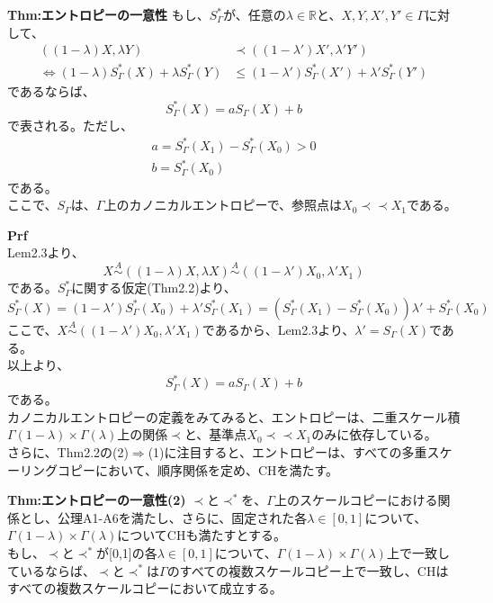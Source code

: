 \documentclass[a4paper,11pt]{jsarticle}
\numberwithin{equation}{section}
\begin{document}
\begin{itembox}[l]{\textbf{Thm:エントロピーの一意性}}
もし、$S_{\Gamma}^*$が、任意の$\lambda \in \mathbb{R}$と、$X,Y,X',Y' \in \Gamma $に対して、
\begin{align}
    ((1-\lambda)X,\lambda Y) &\prec ((1-\lambda')X',\lambda' Y') \\
    \Leftrightarrow (1-\lambda)S_{\Gamma}^*(X)+\lambda S_{\Gamma}^*(Y) &\leq (1-\lambda')S_{\Gamma}^*(X')+\lambda' S_{\Gamma}^*(Y')
\end{align}
であるならば、
\begin{equation}
    S_{\Gamma}^*(X)=aS_{\Gamma} (X)+b
\end{equation}
で表される。ただし、
\begin{align}
    a = S_{\Gamma}^*(X_1)-S_{\Gamma}^*(X_0)>0\\
    b = S_{\Gamma}^*(X_0)
\end{align}
である。\\
ここで、$S_{\Gamma}$は、$\Gamma$上のカノニカルエントロピーで、参照点は$X_0 \prec \prec X_1$である。
\end{itembox}
\textbf{Prf}\\
Lem2.3より、
\begin{equation}
    X \overset{A}{\sim} ((1-\lambda)X,\lambda X) \overset{A}{\sim} ((1-\lambda')X_0,\lambda' X_1)
\end{equation}
である。$S_{\Gamma}^*$に関する仮定(Thm2.2)より、
\begin{equation}
    S_{\Gamma}^*(X) = (1-\lambda')S_{\Gamma}^*(X_0)+\lambda' S_{\Gamma}^*(X_1)=(S_{\Gamma}^*(X_1)-S_{\Gamma}^*(X_0))\lambda'+S_{\Gamma}^*(X_0)
\end{equation}
ここで、$X \overset{A}{\sim} ((1-\lambda')X_0,\lambda' X_1)$であるから、Lem2.3より、$\lambda ' = S_{\Gamma}(X)$である。\\
以上より、
\begin{equation}
    S_{\Gamma}^*(X) = aS_{\Gamma}(X)+b
\end{equation}
である。\hfill\qedsymbol\\

カノニカルエントロピーの定義をみてみると、エントロピーは、二重スケール積$\Gamma(1-\lambda)\times \Gamma(\lambda)$上の関係$\prec$と、基準点$X_0 \prec \prec X_1$のみに依存している。\\
さらに、Thm2.2の(2)$ \Rightarrow $(1)に注目すると、エントロピーは、すべての多重スケーリングコピーにおいて、順序関係を定め、CHを満たす。\\

\begin{itembox}[l]{\textbf{Thm:エントロピーの一意性(2)}}
    $\prec$と$\prec ^*$を、$\Gamma$上のスケールコピーにおける関係とし、公理A1-A6を満たし、さらに、固定された各$\lambda \in [0,1]$について、$\Gamma(1-\lambda)\times \Gamma(\lambda)$についてCHも満たすとする。\\
    もし、$\prec$と$\prec ^*$が[0,1]の各$\lambda\in [0,1]$について、$\Gamma(1-\lambda)\times \Gamma(\lambda)$上で一致しているならば、$\prec$と$\prec ^*$は$\Gamma$のすべての複数スケールコピー上で一致し、CHはすべての複数スケールコピーにおいて成立する。
\end{itembox}
\end{document}
